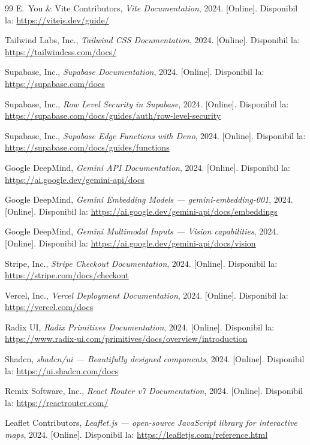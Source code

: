 \documentclass[12pt,a4paper,oneside]{report}
\begin{document}
\begin{thebibliography}{99}
E.~You \& Vite Contributors, \textit{Vite Documentation}, 2024. [Online]. Disponibil la: \url{https://vitejs.dev/guide/}

Tailwind Labs, Inc., \textit{Tailwind CSS Documentation}, 2024. [Online]. Disponibil la: \url{https://tailwindcss.com/docs/}

Supabase, Inc., \textit{Supabase Documentation}, 2024. [Online]. Disponibil la: \url{https://supabase.com/docs}

Supabase, Inc., \textit{Row Level Security in Supabase}, 2024. [Online]. Disponibil la: \url{https://supabase.com/docs/guides/auth/row-level-security}

Supabase, Inc., \textit{Supabase Edge Functions with Deno}, 2024. [Online]. Disponibil la: \url{https://supabase.com/docs/guides/functions}

Google DeepMind, \textit{Gemini API Documentation}, 2024. [Online]. Disponibil la: \url{https://ai.google.dev/gemini-api/docs}

Google DeepMind, \textit{Gemini Embedding Models — gemini-embedding-001}, 2024. [Online]. Disponibil la: \url{https://ai.google.dev/gemini-api/docs/embeddings}

Google DeepMind, \textit{Gemini Multimodal Inputs — Vision capabilities}, 2024. [Online]. Disponibil la: \url{https://ai.google.dev/gemini-api/docs/vision}

Stripe, Inc., \textit{Stripe Checkout Documentation}, 2024. [Online]. Disponibil la: \url{https://stripe.com/docs/checkout}

Vercel, Inc., \textit{Vercel Deployment Documentation}, 2024. [Online]. Disponibil la: \url{https://vercel.com/docs}

Radix UI, \textit{Radix Primitives Documentation}, 2024. [Online]. Disponibil la: \url{https://www.radix-ui.com/primitives/docs/overview/introduction}

Shadcn, \textit{shadcn/ui — Beautifully designed components}, 2024. [Online]. Disponibil la: \url{https://ui.shadcn.com/docs}

Remix Software, Inc., \textit{React Router v7 Documentation}, 2024. [Online]. Disponibil la: \url{https://reactrouter.com/}

Leaflet Contributors, \textit{Leaflet.js — open-source JavaScript library for interactive maps}, 2024. [Online]. Disponibil la: \url{https://leafletjs.com/reference.html}


\end{thebibliography}
\end{document}
